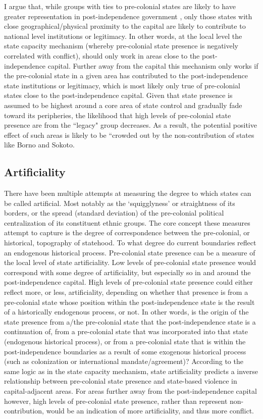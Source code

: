 \documentclass[12pt]{article}
\begin{document}
I argue that, while groups with ties to pre-colonial states are likely to have
greater representation in post-independence government \citep{Paine2019}, only
those states with close geographical/physical proximity to the capital are likely
to contribute to national level institutions or legitimacy. In other words, at
the local level the state capacity mechanism (whereby pre-colonial state
presence is negatively correlated with conflict), should only work in areas
close to the post-independence capital. Further away from the capital this
mechanism only works if the pre-colonial state in a given area has contributed
to the post-independence state institutions or legitimacy, which is most likely
only true of pre-colonial states close to the post-independence capital. Given
that state presence is assumed to be highest around a core area of state control
and gradually fade toward its peripheries, the likelihood that high levels of
pre-colonial state presence are from the ``legacy" group decreases. As a
result, the potential positive effect of such areas is likely to be ``crowded
out by the non-contribution of states like Borno and Sokoto.

\subsection{Artificiality} \label{Artificiality}

There have been multiple attempts at measuring the degree to which states can be
called artificial. Most notably as the `squigglyness' or straightness of its
borders, or the spread (standard deviation) of the pre-colonial political
centralization of its constituent ethnic groups. The core concept these measures
attempt to capture is the degree of correspondence between the pre-colonial, or
historical, topography of statehood. To what degree do current boundaries
reflect an endogenous historical process. Pre-colonial state presence can be a
measure of the local level of state artificiality. Low levels of pre-colonial
state presence would correspond with some degree of artificiality, but
especially so in and around the post-independence capital. High levels of
pre-colonial state presence could either reflect more, or less, artificiality,
depending on whether that presence is from a pre-colonial state whose position
within the post-independence state is the result of a historically endogenous
process, or not. In other words, is the origin of the state presence from a/the
pre-colonial state that the post-independence state is a continuation of, from a
pre-colonial state that was incorporated into that state (endogenous historical
process), or from a pre-colonial state that is within the post-independence
boundaries as a result of some exogenous historical process (such as
colonization or international mandate/agreement)? According to the same logic as
in the state capacity mechanism, state artificiality predicts a inverse
relationship between pre-colonial state presence and state-based violence in
capital-adjacent areas. For areas further away from the post-independence
capital however, high levels of pre-colonial state presence, rather than
represent non-contribution, would be an indication of more artificiality, and
thus more conflict.
\end{document}
